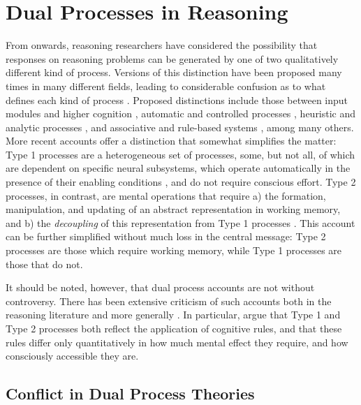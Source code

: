 
\section{Dual Processes in Reasoning}
\label{sec:chapter1-dual-process}

From \citet{Wason1975} onwards,
reasoning researchers have considered the possibility
that responses on reasoning problems can be generated by one of two
qualitatively different kind of process.
Versions of this distinction have been proposed
many times in many different fields,
leading to considerable confusion as to
what defines each kind of process
\citep[see][]{Evans2013a,Stanovich2012,Evans2008}.
Proposed distinctions include those between \citep[from][]{Evans2008}
input modules and higher cognition \citep{Fodor1983},
automatic and controlled processes \citep{Schneider1977},
heuristic and analytic processes \citep{Evans1984,Evans2006},
and associative and rule-based systems \citep{Sloman1996},
among many others.
More recent accounts \citep[e.g.][]{Evans2013a}
offer a distinction that somewhat simplifies the matter:
Type 1 processes are a heterogeneous set of processes,
some, but not all, of which are dependent on specific neural subsystems,
which operate automatically in the presence of their enabling conditions
\citep[that is, they are \emph{autonomous};][]{Stanovich2009},
and do not require conscious effort.
Type 2 processes, in contrast, are mental operations that require
a) the formation, manipulation, and updating of
an abstract representation in working memory, and
b) the \emph{decoupling} of this representation from Type 1 processes
\citep[see][]{Stanovich2012}.
This account can be further simplified 
without much loss in the central message:
Type 2 processes are those which require working memory,
while Type 1 processes are those that do not.

It should be noted, however, that
dual process accounts are not without controversy.
There has been extensive criticism of such accounts
both in the reasoning literature
\citep{Kruglanski2013,Kruglanski2011,Gigerenzer1996a,Osman2004}
and more generally \citep[e.g.][]{Newell2014,Tunney2003}.
In particular, \citet[][also \citealp{Gigerenzer1996a}]{Kruglanski2011}
argue that Type 1 and Type 2 processes
both reflect the application of cognitive rules,
and that these rules differ only quantitatively
in how much mental effect they require,
and how consciously accessible they are.


\subsection{Conflict in Dual Process Theories}
\label{subsec:chapter1-dual-process-conflict}

